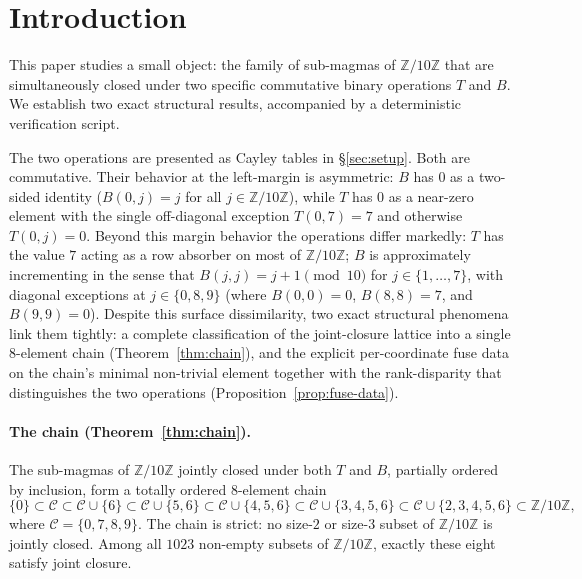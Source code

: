 \documentclass[11pt,reqno]{amsart}
\theoremstyle{plain}
\theoremstyle{definition}
\theoremstyle{remark}
\newcommand{\Z}{\mathbb{Z}}
\newcommand{\Zten}{\Z/10\Z}
\newcommand{\Cfour}{\mathcal{C}}
\begin{document}
\section{Introduction}\label{sec:intro}

This paper studies a small object: the family of sub-magmas of
$\Zten$ that are simultaneously closed under two specific
commutative binary operations $T$ and $B$. We establish two
exact structural results, accompanied by a deterministic
verification script.

The two operations are presented as Cayley tables in
\S\ref{sec:setup}. Both are commutative. Their behavior at the
left-margin is asymmetric: $B$ has $0$ as a two-sided identity
($B(0, j) = j$ for all $j \in \Zten$), while $T$ has $0$ as a
near-zero element with the single off-diagonal exception
$T(0, 7) = 7$ and otherwise $T(0, j) = 0$. Beyond this margin
behavior the operations differ markedly: $T$ has the value $7$
acting as a row absorber on most of $\Zten$; $B$ is approximately
incrementing in the sense that $B(j,j) = j+1 \pmod{10}$ for
$j \in \{1,\dots,7\}$, with diagonal exceptions at
$j \in \{0,8,9\}$ (where $B(0,0)=0$, $B(8,8)=7$, and $B(9,9)=0$).
Despite this surface dissimilarity, two exact structural
phenomena link them tightly: a complete classification of the
joint-closure lattice into a single $8$-element chain
(Theorem~\ref{thm:chain}), and the explicit per-coordinate fuse
data on the chain's minimal non-trivial element together with
the rank-disparity that distinguishes the two operations
(Proposition~\ref{prop:fuse-data}).

\paragraph{The chain (Theorem~\ref{thm:chain}).} The sub-magmas of
$\Zten$ jointly closed under both $T$ and $B$, partially ordered
by inclusion, form a totally ordered $8$-element chain
\[
\{0\}\subset\Cfour\subset\Cfour\cup\{6\}\subset\Cfour\cup\{5,6\}\subset
\Cfour\cup\{4,5,6\}\subset\Cfour\cup\{3,4,5,6\}\subset
\Cfour\cup\{2,3,4,5,6\}\subset\Zten,
\]
where $\Cfour=\{0,7,8,9\}$. The chain is strict: no size-$2$ or
size-$3$ subset of $\Zten$ is jointly closed. Among all $1023$
non-empty subsets of $\Zten$, exactly these eight satisfy joint
closure.
\end{document}
